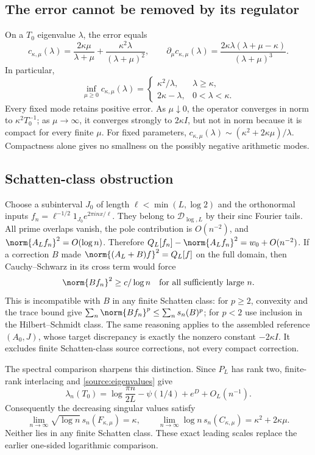 \subsection{The error cannot be removed by its regulator}
On a $T_0$ eigenvalue $\lambda$, the error equals
\[
c_{\kappa,\mu}(\lambda)
 =\frac{2\kappa\mu}{\lambda+\mu}
       +\frac{\kappa^2\lambda}{(\lambda+\mu)^2},\qquad
\partial_\mu c_{\kappa,\mu}(\lambda)
 =\frac{2\kappa\lambda(\lambda+\mu-\kappa)}
             {(\lambda+\mu)^3}.
\]
In particular,
\[
\inf_{\mu\ge0}c_{\kappa,\mu}(\lambda)=
\begin{cases}
\kappa^2/\lambda,&\lambda\ge\kappa,\\
2\kappa-\lambda,&0<\lambda<\kappa.
\end{cases}
\]
Every fixed mode retains positive error.
As $\mu\downarrow0$, the operator converges in norm to
$\kappa^2T_0^{-1}$; as $\mu\to\infty$, it converges strongly to
$2\kappa I$, but not in norm because it is compact for every
finite $\mu$. For fixed parameters,
$c_{\kappa,\mu}(\lambda)\sim(\kappa^2+2\kappa\mu)/\lambda$.
Compactness alone gives no smallness on the possibly negative
arithmetic modes.

\subsection{Schatten-class obstruction}
Choose a subinterval $J_0$ of length
$\ell<\min(L,\log2)$ and the orthonormal inputs
$f_n=\ell^{-1/2}1_{J_0}e^{2\pi inx/\ell}$.
They belong to $\mathcal D_{\log,L}$ by their sinc Fourier tails.
All prime overlaps vanish, the pole contribution is $O(n^{-2})$,
and $\norm{A_Lf_n}^2=O(\log n)$. Therefore
$Q_L[f_n]-\norm{A_Lf_n}^2=w_0+O(n^{-2})$.
If a correction $B$ made $\norm{(A_L+B)f}^2=Q_L[f]$ on the full
domain, then Cauchy--Schwarz in its cross term would force
\[
\norm{Bf_n}^2\ge c/\log n
\quad\text{for all sufficiently large }n.
\]
This is incompatible with $B$ in any finite Schatten class:
for $p\ge2$, convexity and the trace bound give
$\sum_n\norm{Bf_n}^p\le\sum_ns_n(B)^p$; for $p<2$ use inclusion
in the Hilbert--Schmidt class. The same reasoning applies to the
assembled reference $(A_0,J)$, whose target discrepancy is exactly
the nonzero constant $-2\kappa I$.
It excludes finite Schatten-class source corrections, not every
compact correction.

The spectral comparison sharpens this distinction. Since $P_L$
has rank two, finite-rank interlacing and
\eqref{source:eigenvalues} give
\begin{equation}\label{feedback:eigenvalues}
\lambda_n(T_0)=\log\frac{\pi n}{2L}-\psi(1/4)+e^D+O_L(n^{-1}).
\end{equation}
Consequently the decreasing singular values satisfy
\begin{equation}\label{feedback:singular}
\lim_{n\to\infty}\sqrt{\log n}\,s_n(F_{\kappa,\mu})=\kappa,
\qquad
\lim_{n\to\infty}\log n\,s_n(C_{\kappa,\mu})
                                  =\kappa^2+2\kappa\mu.
\end{equation}
Neither lies in any finite Schatten class. These exact leading
scales replace the earlier one-sided logarithmic comparison.
